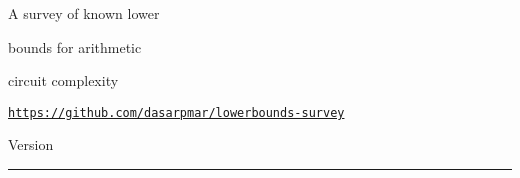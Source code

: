 \documentclass[12pt]{report}
\author{%
    Ramprasad Saptharishi \\
    Tel Aviv University \\
    \texttt{ramprasad@cmi.ac.in}
    }
\makeatletter
\def\printauthor{%
    {\large \@author}}
\makeatother
\begin{document}
\begin{titlepage}
\noindent
\vspace*{1cm}

\titlefont A survey of known lower\par bounds for arithmetic \par circuit complexity
\epigraph{\tt \url{https://github.com/dasarpmar/lowerbounds-survey}}{Version \currentversion}
\null\vfill
\vspace*{1cm}
\noindent
\hfill
\begin{minipage}{0.50\linewidth}
    \begin{flushright}

      \vspace*{1cm}

        \printauthor

        \ccbyncsa


    \end{flushright}
\end{minipage}
%
\begin{minipage}{0.02\linewidth}
    \rule{1pt}{100pt}
\end{minipage}
\end{titlepage}



\end{document}
